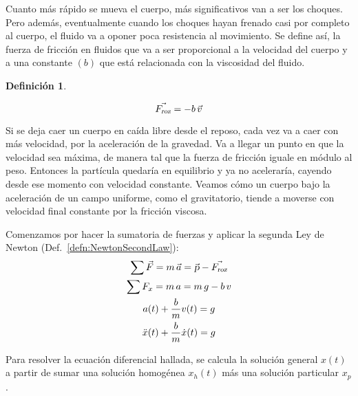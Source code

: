 \documentclass[a5paper,12pt,twoside]{book}
\newtheorem{defn}{{Definición}}[chapter]
\begin{document}
Cuanto más rápido se mueva el cuerpo, más significativos van a ser los choques. Pero además, eventualmente cuando los choques hayan frenado casi por completo al cuerpo, el fluido va a oponer poca resistencia al movimiento. Se define así, la fuerza de fricción en fluidos que va a ser proporcional a la velocidad del cuerpo y a una constante $(b)$ que está relacionada con la viscosidad del fluido.

\begin{mdframed}[style=MyFrame1]
    \begin{defn}
        \label{defn:fluidFrictionForce}
    \end{defn}
    \begin{equation*}
        \Vec{{{F}_\textsl{{roz}}}} = - b \, \Vec{v}
    \end{equation*}
\end{mdframed}

Si se deja caer un cuerpo en caída libre desde el reposo, cada vez va a caer con más velocidad, por la aceleración de la gravedad. Va a llegar un punto en que la velocidad sea máxima, de manera tal que la fuerza de fricción iguale en módulo al peso. Entonces la partícula quedaría en equilibrio y ya no aceleraría, cayendo desde ese momento con velocidad constante. Veamos cómo un cuerpo bajo la aceleración de un campo uniforme, como el gravitatorio, tiende a moverse con velocidad final constante por la fricción viscosa.

\begin{center}
    \def\svgwidth{0.8\linewidth}
    
\end{center}

Comenzamos por hacer la sumatoria de fuerzas y aplicar la segunda Ley de Newton (Def.\ \ref{defn:NewtonSecondLaw}):
\begin{gather*}
    \sum \Vec{F} = m \, \Vec{a} = \Vec{\textsl{p}} - \Vec{{{F}_\textsl{{roz}}}}
    \\
    \sum F_x = m \, a = m \, g - b \, v
    \\
    a(t) + \frac{b}{m} v(t) = g
    \\
    \ddot{x}(t) + \frac{b}{m} \dot{x}(t) = g
\end{gather*}

Para resolver la ecuación diferencial hallada, se calcula la solución general $x(t)$ a partir de sumar una solución homogénea $x_h(t)$ más una solución particular $x_p$.
\end{document}
